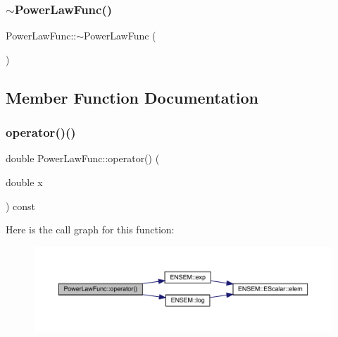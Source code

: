\mbox{\label{classPowerLawFunc_a596daf259340179e1b3dc82e00569135}} 
\subsubsection{\texorpdfstring{$\sim$PowerLawFunc()}{~PowerLawFunc()}\hspace{0.1cm}{\footnotesize\ttfamily [2/2]}}
{\footnotesize\ttfamily Power\+Law\+Func\+::$\sim$\+Power\+Law\+Func (\begin{DoxyParamCaption}{ }\end{DoxyParamCaption})\hspace{0.3cm}{\ttfamily [inline]}}



\subsection{Member Function Documentation}
\mbox{\label{classPowerLawFunc_a39c1ca06f0f0f4b7874be6fe8c67f3e3}} 
\subsubsection{\texorpdfstring{operator()()}{operator()()}\hspace{0.1cm}{\footnotesize\ttfamily [1/2]}}
{\footnotesize\ttfamily double Power\+Law\+Func\+::operator() (\begin{DoxyParamCaption}\item[{double}]{x }\end{DoxyParamCaption}) const\hspace{0.3cm}{\ttfamily [inline]}}

Here is the call graph for this function\+:
\nopagebreak
\begin{figure}[H]
\begin{center}
\leavevmode
\includegraphics[width=350pt]{d3/db8/classPowerLawFunc_a39c1ca06f0f0f4b7874be6fe8c67f3e3_cgraph}
\end{center}
\end{figure}
\mbox{\label{classPowerLawFunc_a39c1ca06f0f0f4b7874be6fe8c67f3e3}} 
